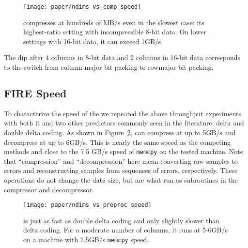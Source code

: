 \begin{figure}[h]
\begin{center}
    \texttt{[image: paper/ndims\_vs\_comp\_speed]}
    \caption{\minesp compresses at hundreds of MB/s even in the slowest case: its highest-ratio setting with incompressible 8-bit data. On lower settings with 16-bit data, it can exceed 1GB/s.}
    \label{fig:ndims_vs_comp_speed}
\end{center}
\end{figure}


The dip after 4 columns in 8-bit data and 2 columns in 16-bit data corresponds to the switch from column-major bit packing to rowmajor bit packing.

\subsection{FIRE Speed}

To characterize the speed of the \fire we repeated the above throughput experiments with both it and two other predictors commonly seen in the literature: delta and double delta coding. As shown in Figure~\ref{fig:ndims_vs_preproc_speed}, \fire can compress at up to 5GB/s and decompress at up to 6GB/s. This is nearly the same speed as the competing methods and close to the 7.5 GB/s speed of \texttt{memcpy} on the tested machine. Note that ``compression'' and ``decompression'' here mean converting raw samples to errors and reconstructing samples from sequences of errors, respectively. These operations do not change the data size, but are what run as subroutines in the \minesp compressor and decompressor.

\begin{figure}[h]
\begin{center}
    \texttt{[image: paper/ndims\_vs\_preproc\_speed]}
    \caption{\fire is just as fast as double delta coding and only slightly slower than delta coding. For a moderate number of columns, it runs at 5-6GB/s on a machine with 7.5GB/s \texttt{memcpy} speed.}
    \label{fig:ndims_vs_preproc_speed}
\end{center}
\end{figure}

